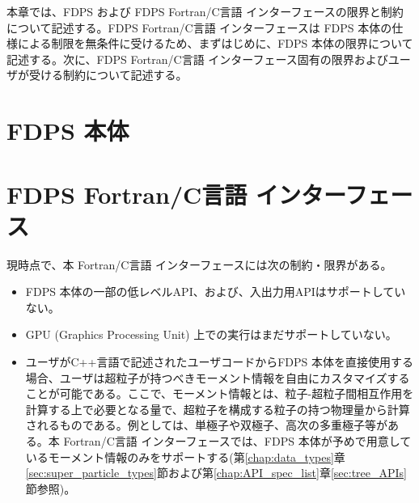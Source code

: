 本章では、FDPS および FDPS Fortran/C言語 インターフェースの限界と制約について記述する。FDPS Fortran/C言語 インターフェースは FDPS 本体の仕様による制限を無条件に受けるため、まずはじめに、FDPS 本体の限界について記述する。次に、FDPS Fortran/C言語 インターフェース固有の限界およびユーザが受ける制約について記述する。

\section{FDPS 本体}
\label{sec:limitation:FDPS}



\section{FDPS Fortran/C言語 インターフェース}
\label{sec:limitation:FDPS_ftn_if}

現時点で、本 Fortran/C言語 インターフェースには次の制約・限界がある。
\begin{itemize}[leftmargin=*,itemsep=-1ex]
\item FDPS 本体の一部の低レベルAPI、および、入出力用APIはサポートしていない。
\item GPU (Graphics Processing Unit) 上での実行はまだサポートしていない。
\item ユーザがC++言語で記述されたユーザコードからFDPS 本体を直接使用する場合、ユーザは超粒子が持つべきモーメント情報を自由にカスタマイズすることが可能である。ここで、モーメント情報とは、粒子-超粒子間相互作用を計算する上で必要となる量で、超粒子を構成する粒子の持つ物理量から計算されるものである。例としては、単極子や双極子、高次の多重極子等がある。本 Fortran/C言語 インターフェースでは、FDPS 本体が予めで用意しているモーメント情報のみをサポートする(第\ref{chap:data_types}章\ref{sec:super_particle_types}節および第\ref{chap:API_spec_list}章\ref{sec:tree_APIs}節参照)。
\end{itemize}